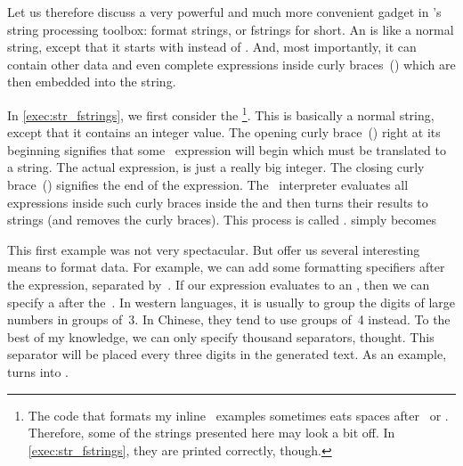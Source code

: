 Let us therefore discuss a very powerful and much more convenient gadget in \python's string processing toolbox: format strings, or \glspl{fstring} for short.
An  is like a normal string, except that it starts with  instead of .
And, most importantly, it can contain other data and even complete expressions inside curly braces~() which are then embedded into the string.%
%
\begin{sloppypar}%
In \cref{exec:str_fstrings}, we first consider the  \footnote{
The code that formats my inline \python\ examples sometimes eats spaces after \textbraceleft\ or \textbraceright. %
Therefore, some of the strings presented here may look a bit off. %
In \cref{exec:str_fstrings}, they are printed correctly, though.}.
This is basically a normal string, except that it contains an integer value.
The opening curly brace~(\inQuotes{\textbraceleft}) right at its beginning signifies that some \python\ expression will begin which must be translated to a string.
The actual expression,  is just a really big integer.
The closing curly brace~(\inQuotes{\textbraceright}) signifies the end of the expression.
The \python\ interpreter evaluates all expressions inside such curly braces inside the  and then turns their results to strings (and removes the curly braces).
This process is called \emph{}.
 simply becomes %
\end{sloppypar}%
%
\begin{sloppypar}%
This first example was not very spectacular.
But  offer us several interesting means to format data.
For example, we can add some formatting specifiers after the expression, separated by~\pythonilIdx{:}.
If our expression evaluates to an , then we can specify a  after the~\pythonilIdx{:}.
In western languages, it is usually to group the digits of large numbers in groups of~3.
In Chinese, they tend to use groups of~4 instead.
To the best of my knowledge, we can only specify thousand separators, thought.
This separator will be placed every three digits in the generated text.
As an example,  turns into .%
\end{sloppypar}%
